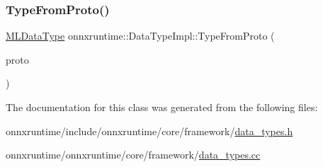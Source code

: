\subsubsection{\texorpdfstring{Type\+From\+Proto()}{TypeFromProto()}}
{\footnotesize\ttfamily \mbox{\hyperlink{namespaceonnxruntime_ad77d0a6e838ec7da5dc35fed5ee66b49}{M\+L\+Data\+Type}} onnxruntime\+::\+Data\+Type\+Impl\+::\+Type\+From\+Proto (\begin{DoxyParamCaption}\item[{const O\+N\+N\+X\+\_\+\+N\+A\+M\+E\+S\+P\+A\+C\+E\+::\+Type\+Proto \&}]{proto }\end{DoxyParamCaption})\hspace{0.3cm}{\ttfamily [static]}}



The documentation for this class was generated from the following files\+:\begin{DoxyCompactItemize}
\item 
onnxruntime/include/onnxruntime/core/framework/\mbox{\hyperlink{data__types_8h}{data\+\_\+types.\+h}}\item 
onnxruntime/onnxruntime/core/framework/\mbox{\hyperlink{data__types_8cc}{data\+\_\+types.\+cc}}\end{DoxyCompactItemize}
